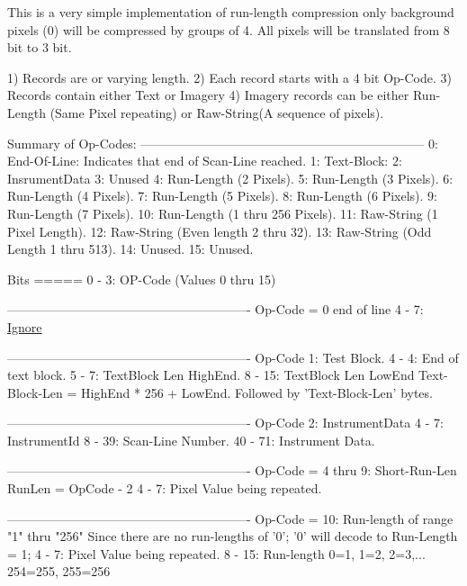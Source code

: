 This is a very simple implementation of run-\/length compression only background pixels (0) will be compressed by groups of 4. All pixels will be translated from 8 bit to 3 bit. 
\begin{DoxyCode}
  1) Records are or varying length.
  2) Each record starts with a 4 bit Op-Code.
  3) Records contain either Text or Imagery
  4) Imagery records can be either Run-Length (Same Pixel repeating) or Raw-String(A sequence of pixels).

   Summary of Op-Codes:
   --------------------------------------------------------------------
   0: End-Of-Line:  Indicates that end of Scan-Line reached.
   1: Text-Block:
   2: InsrumentData
   3: Unused
   4: Run-Length (2 Pixels).
   5: Run-Length (3 Pixels).
   6: Run-Length (4 Pixels).
   7: Run-Length (5 Pixels).
   8: Run-Length (6 Pixels).
   9: Run-Length (7 Pixels).
  10: Run-Length (1 thru 256 Pixels).
  11: Raw-String (1 Pixel Length).
  12: Raw-String (Even length 2 thru 32).
  13: Raw-String (Odd Length 1 thru 513).
  14: Unused.
  15: Unused.


  Bits
  =====
  0 - 3:  OP-Code  (Values 0 thru 15)


----------------------------------------------------------
  Op-Code = 0   end of line
  4 - 7:  \hyperlink{namespace_k_k_m_l_l_a99973706982b59debba670e2480555abafd038fc7f319e48f3115d92bf5bdbef9}{Ignore}


----------------------------------------------------------
  Op-Code 1:   Test Block.
  4 -  4:  End of text block.
  5 -  7:  TextBlock Len HighEnd.
  8 - 15:  TextBlock Len LowEnd
    Text-Block-Len = HighEnd * 256 + LowEnd.
  Followed by \textcolor{stringliteral}{'Text-Block-Len'} bytes.


----------------------------------------------------------
  Op-Code 2:  InstrumentData
  4 -  7:  InstrumentId
  8 - 39:  Scan-Line Number.
 40 - 71:  Instrument Data.


----------------------------------------------------------
  Op-Code = 4 thru 9:  Short-Run-Len
                       RunLen = OpCode - 2
  4 -  7: Pixel Value being repeated.


----------------------------------------------------------
 Op-Code = 10:   Run-length of range \textcolor{stringliteral}{"1"} thru \textcolor{stringliteral}{"256"}
                 Since there are no run-lengths of \textcolor{charliteral}{'0'};  \textcolor{charliteral}{'0'} will decode to Run-Length = 1;
  4 -  7: Pixel Value being repeated.
  8 - 15: Run-length     0=1, 1=2, 2=3,... 254=255, 255=256



\end{DoxyCode}
